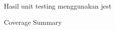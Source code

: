 \begin{figure}[h]
	{\par}
	\caption{Hasil unit testing menggunakan jest}
	\label{unit-testing}
\end{figure}

\begin{figure}[h]
	{\par}
	\caption{Coverage Summary}
	\label{coverage-summary}
\end{figure}

\newpage

